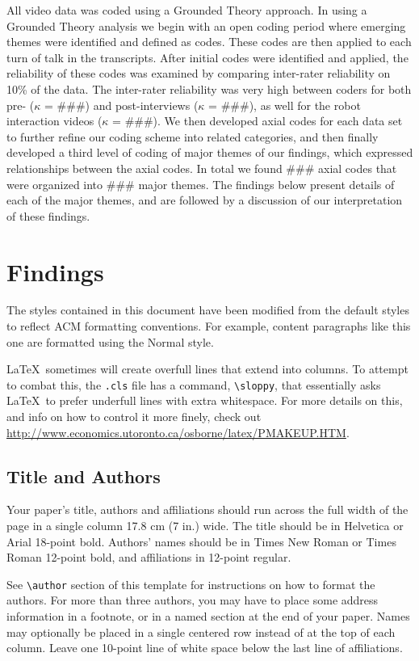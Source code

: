 \documentclass{sigchi}
\begin{document}
  All video data was coded using a Grounded Theory approach. In using a Grounded Theory analysis we begin with an open coding period where emerging themes were identified and defined as codes. These codes are then applied to each turn of talk in the transcripts. After initial codes were identified and applied, the reliability of these codes was examined by comparing inter-rater reliability on 10\% of the data. The inter-rater reliability was very high between coders for both pre- ($\kappa$ = \#\#\#) and post-interviews ($\kappa$ = \#\#\#), as well for the robot interaction videos ($\kappa$ = \#\#\#). We then developed axial codes for each data set to further refine our coding scheme into related categories, and then finally developed a third level of coding of major themes of our findings, which expressed relationships between the axial codes. In total we found \#\#\# axial codes that were organized into \#\#\# major themes. The findings below present details of each of the major themes, and are followed by a discussion of our interpretation of these findings.
 
\section{Findings}
The styles contained in this document have been modified from the
default styles to reflect ACM formatting conventions. For example,
content paragraphs like this one are formatted using the Normal style.

\LaTeX\ sometimes will create overfull lines that extend into columns.
To attempt to combat this, the \texttt{.cls} file has a command,
\texttt{{\textbackslash}sloppy}, that essentially asks \LaTeX\ to
prefer underfull lines with extra whitespace.  For more details on
this, and info on how to control it more finely, check out
{\url{http://www.economics.utoronto.ca/osborne/latex/PMAKEUP.HTM}}.


\subsection{Title and Authors}

Your paper's title, authors and affiliations should run across the
full width of the page in a single column 17.8 cm (7 in.) wide.  The
title should be in Helvetica or Arial 18-point bold.  Authors' names
should be in Times New Roman or Times Roman 12-point bold, and
affiliations in 12-point regular.  

See \texttt{{\textbackslash}author} section of this template for
instructions on how to format the authors. For more than three
authors, you may have to place some address information in a footnote,
or in a named section at the end of your paper. Names may optionally
be placed in a single centered row instead of at the top of each
column. Leave one 10-point line of white space below the last line of
affiliations.
\end{document}
